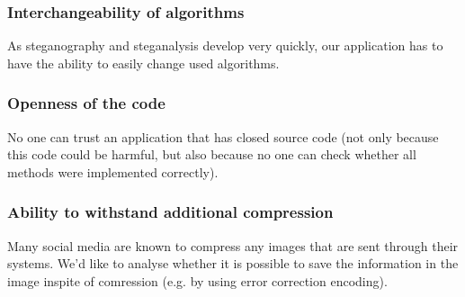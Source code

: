 \subsubsection{Interchangeability of algorithms}
As steganography and steganalysis develop very quickly, our application
has to have the ability to easily change used algorithms.  

\subsubsection{Openness of the code}
No one can trust an application that has closed source code (not only because
this code could be harmful, but also because no one can check whether all
methods were implemented correctly).

\subsubsection{Ability to withstand additional compression}
Many social media are known to compress any images that are sent through
their systems. We'd like to analyse whether it is possible to save the information
in the image inspite of comression (e.g. by using error correction encoding).
